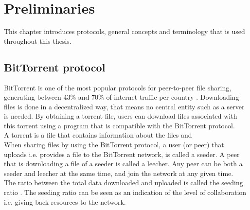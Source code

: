 \chapter{Preliminaries}
\label{chp:preliminaries}

This chapter introduces protocols, general concepts and terminology that is used throughout this thesis.

\section{BitTorrent protocol}
BitTorrent is one of the most popular protocols for peer-to-peer file sharing, generating between 43\% and 70\% of internet traffic per country .
Downloading files is done in a decentralized way, that means no central entity such as a server is needed.
By obtaining a torrent file, users can download files associated with this torrent using a program that is compatible with the BitTorrent protocol.\\

A torrent is a file that contains information about the files and \\
 
When sharing files by using the BitTorrent protocol, a user (or peer) that uploads i.e. provides a file to the BitTorrent network, is called a seeder.
A peer that is downloading a file of a seeder is called a leecher.
Any peer can be both a seeder and leecher at the same time, and join the network at any given time.\\

The ratio between the total data downloaded and uploaded is called the seeding ratio \cite{Cohen-bittorrent}.
The seeding ratio can be seen as an indication of the level of collaboration i.e. giving back resources to the network.\\


